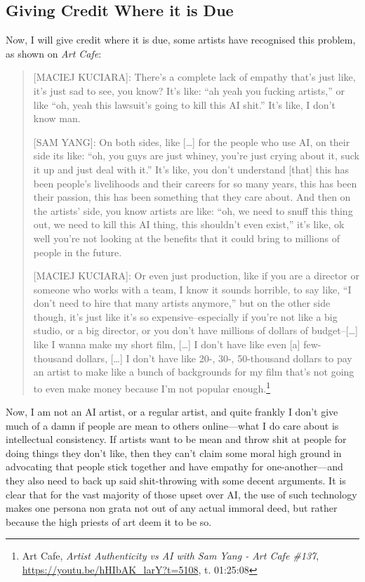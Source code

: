 \documentclass[11pt]{article}
\begin{document}
\subsection*{Giving Credit Where it is Due}
\label{sec:orge3c3ece}
Now, I will give credit where it is due, some artists have recognised this problem, as shown on \emph{Art Cafe}:
\begin{quote}
[MACIEJ KUCIARA]: There's a complete lack of empathy that's just like, it's just sad to see, you know? It's like: ``ah yeah you fucking artists,'' or like ``oh, yeah this lawsuit's going to kill this AI shit.'' It's like, I don't know man.

[SAM YANG]: On both sides, like [\ldots{}] for the people who use AI, on their side its like: ``oh, you guys are just whiney, you're just crying about it, suck it up and just deal with it.'' It's like, you don't understand [that] this has been people's livelihoods and their careers for so many years, this has been their passion, this has been something that they care about. And then on the artists' side, you know artists are like: ``oh, we need to snuff this thing out, we need to kill this AI thing, this shouldn't even exist,'' it's like, ok well you're not looking at the benefits that it could bring to millions of people in the future.

[MACIEJ KUCIARA]: Or even just production, like if you are a director or someone who works with a team, I know it sounds horrible, to say like, ``I don't need to hire that many artists anymore,'' but on the other side though, it's just like it's so expensive--especially if you're not like a big studio, or a big director, or you don't have millions of dollars of budget--[\ldots{}] like I wanna make my short film, [\ldots{}] I don't have like even [a] few-thousand dollars, [\ldots{}] I don't have like 20-, 30-, 50-thousand dollars to pay an artist to make like a bunch of backgrounds for my film that's not going to even make money because I'm not popular enough.\footnote{Art Cafe, \emph{Artist Authenticity vs AI with Sam Yang - Art Cafe \#137}, \url{https://youtu.be/hHIbAK\_larY?t=5108}, t. 01:25:08}
\end{quote}

Now, I am not an AI artist, or a regular artist, and quite frankly I don't give much of a damn if people are mean to others online---what I do care about is intellectual consistency. If artists want to be mean and throw shit at people for doing things they don't like, then they can't claim some moral high ground in advocating that people stick together and have empathy for one-another---and they also need to back up said shit-throwing with some decent arguments. It is clear that for the vast majority of those upset over AI, the use of such technology makes one persona non grata not out of any actual immoral deed, but rather because the high priests of art deem it to be so.
\end{document}
